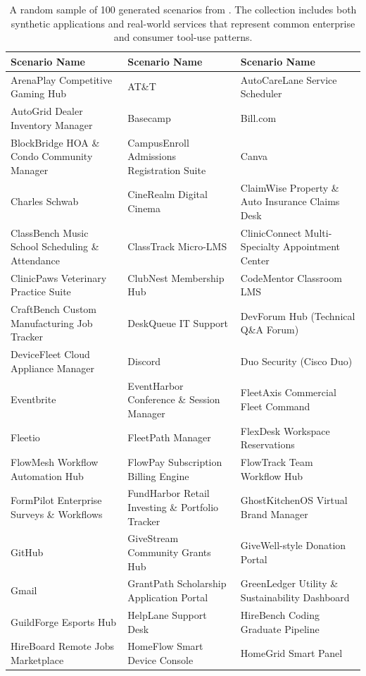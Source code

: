\begin{table}[t]
\centering
\caption{A random sample of 100 generated scenarios from \synth.
The collection includes both synthetic applications and real-world services that represent common enterprise and consumer tool-use patterns.}
\label{tab:scenarios_demo}
\scriptsize
\begin{tabular}{p{5.2cm}p{5.2cm}p{5.2cm}}
\toprule
\textbf{Scenario Name} & \textbf{Scenario Name} & \textbf{Scenario Name} \\
\midrule
ArenaPlay Competitive Gaming Hub & AT\&T & AutoCareLane Service Scheduler \\
AutoGrid Dealer Inventory Manager & Basecamp & Bill.com \\
BlockBridge HOA \& Condo Community Manager & CampusEnroll Admissions Registration Suite & Canva \\
Charles Schwab & CineRealm Digital Cinema & ClaimWise Property \& Auto Insurance Claims Desk \\
ClassBench Music School Scheduling \& Attendance & ClassTrack Micro-LMS & ClinicConnect Multi-Specialty Appointment Center \\
ClinicPaws Veterinary Practice Suite & ClubNest Membership Hub & CodeMentor Classroom LMS \\
CraftBench Custom Manufacturing Job Tracker & DeskQueue IT Support & DevForum Hub (Technical Q\&A Forum) \\
DeviceFleet Cloud Appliance Manager & Discord & Duo Security (Cisco Duo) \\
Eventbrite & EventHarbor Conference \& Session Manager & FleetAxis Commercial Fleet Command \\
Fleetio & FleetPath Manager & FlexDesk Workspace Reservations \\
FlowMesh Workflow Automation Hub & FlowPay Subscription Billing Engine & FlowTrack Team Workflow Hub \\
FormPilot Enterprise Surveys \& Workflows & FundHarbor Retail Investing \& Portfolio Tracker & GhostKitchenOS Virtual Brand Manager \\
GitHub & GiveStream Community Grants Hub & GiveWell-style Donation Portal \\
Gmail & GrantPath Scholarship Application Portal & GreenLedger Utility \& Sustainability Dashboard \\
GuildForge Esports Hub & HelpLane Support Desk & HireBench Coding Graduate Pipeline \\
HireBoard Remote Jobs Marketplace & HomeFlow Smart Device Console & HomeGrid Smart Panel \\

\end{tabular}
\end{table}
